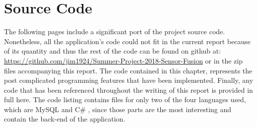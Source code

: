 
\appendix
\chapter{Source Code}
\label{app:source_code}
The following pages include a significant port of the project source code. Nonetheless, all the application's code could not fit in the current report because of its quantity and thus the rest of the code can be found on github at: \url{https://github.com/jim1924/Summer-Project-2018-Sensor-Fusion} or in the zip files accompanying this report. The code contained in this chapter, represents the post complicated programming features that have been implemented. Finally, any code that has been referenced throughout the writing of this report is provided in full here. The code listing contains files for only two of the four languages used, which are MySQL and C\# , since those parts are the most interesting and contain the back-end of the application.

